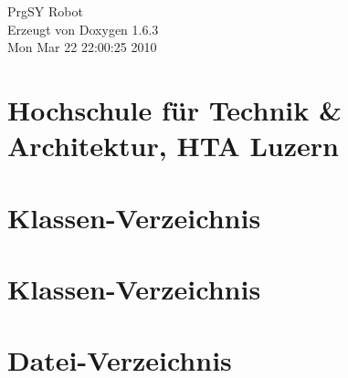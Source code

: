 \documentclass[a4paper]{book}
\begin{document}
\hypersetup{pageanchor=false}
\begin{titlepage}
\vspace*{7cm}
\begin{center}
{\Large PrgSY Robot }\\
\vspace*{1cm}
{\large Erzeugt von Doxygen 1.6.3}\\
\vspace*{0.5cm}
{\small Mon Mar 22 22:00:25 2010}\\
\end{center}
\end{titlepage}
\clearemptydoublepage
{}
\tableofcontents
\clearemptydoublepage
{}
\hypersetup{pageanchor=true}
\chapter{Hochschule f\"{u}r Technik \& Architektur, HTA Luzern}
\label{index}\hypertarget{index}{}
\chapter{Klassen-\/Verzeichnis}

\chapter{Klassen-\/Verzeichnis}

\chapter{Datei-\/Verzeichnis}

\end{document}
